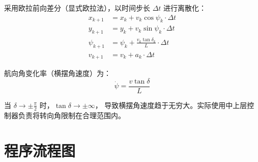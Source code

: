 \documentclass[a4paper,10pt]{article}
\begin{document}
采用欧拉前向差分（显式欧拉法），以时间步长 $\Delta t$ 进行离散化：
\begin{equation}\label{eq:discrete}
  \boxed{
  \begin{aligned}
    x_{k+1}   &= x_k + v_k \cos\psi_k \cdot \Delta t \\
    y_{k+1}   &= y_k + v_k \sin\psi_k \cdot \Delta t \\
    \psi_{k+1} &= \psi_k + \frac{v_k \tan\delta_k}{L} \cdot \Delta t \\
    v_{k+1}   &= v_k + a_k \cdot \Delta t
  \end{aligned}
  }
\end{equation}

航向角变化率（横摆角速度）为：
\begin{equation}
  \dot{\psi} = \frac{v \tan\delta}{L}
\end{equation}

当 $\delta \to \pm\frac{\pi}{2}$ 时，$\tan\delta \to \pm\infty$，
导致横摆角速度趋于无穷大。实际使用中上层控制器负责将转向角限制在合理范围内。

\section{程序流程图}
\end{document}
